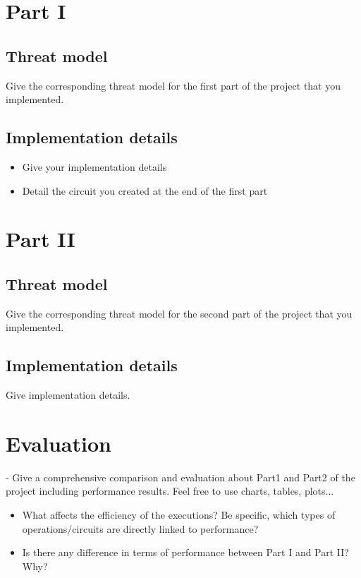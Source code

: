 \documentclass[10pt,conference,compsocconf]{IEEEtran}
\begin{document}
\section{Part I}

\subsection{Threat model}
Give the corresponding threat model for the first part of the project that you implemented. 
\subsection{Implementation details}
\begin{itemize}
    \item Give your implementation details
    \item Detail the circuit you created at the end of the first part
\end{itemize}
\section{Part II}
\subsection{Threat model}
Give the corresponding threat model for the second part of the project that you implemented. 
\subsection{Implementation details}
Give implementation details.
\section{Evaluation}
- Give a comprehensive comparison and evaluation about Part1 and Part2 of the project including performance results. Feel free to use charts, tables, plots...\\
\begin{itemize}
    \item What affects the efficiency of the executions? Be specific, which types of operations/circuits are directly linked to performance?
    \item Is there any difference in terms of performance between Part I and Part II? Why? 
\end{itemize}
\end{document}

